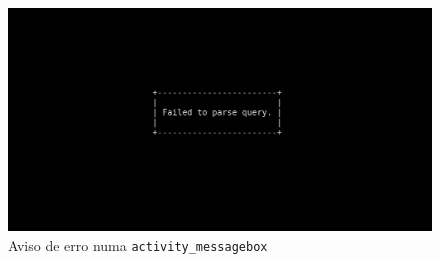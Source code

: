 \documentclass[12pt, a4paper]{article}
\begin{document}
\begin{figure}[ht]
    \centering
    \includegraphics[scale=0.25]{res-fase2/interactive_screenshots/messagebox.png}
	\caption{Aviso de erro numa \texttt{activity\_messagebox}}
    \label{fig:messagebox}
\end{figure}
\end{document}
